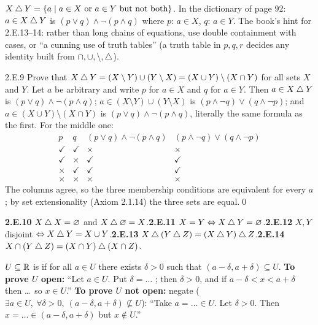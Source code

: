 \begin{key}
$X\mathbin{\triangle} Y=\{a\mid a\in X\text{ or }a\in Y\text{ but not both}\}$. In the dictionary of page 92: $a\in X\mathbin{\triangle} Y$ is $(p\vee q)\wedge\neg(p\wedge q)$ where $p$: $a\in X$, $q$: $a\in Y$. The book's hint for 2.E.13--14: rather than long chains of equations, use double containment with cases, or ``a cunning use of truth tables'' (a truth table in $p,q,r$ decides any identity built from $\cap,\cup,\setminus,\mathbin{\triangle}$).
\end{key}

\begin{bookex}{2.E.9}
Prove that $X\mathbin{\triangle} Y=(X\setminus Y)\cup(Y\setminus X)=(X\cup Y)\setminus(X\cap Y)$ for all sets $X$ and $Y$.
\solution
Let $a$ be arbitrary and write $p$ for $a\in X$ and $q$ for $a\in Y$. Then $a\in X\mathbin{\triangle} Y$ is $(p\vee q)\wedge\neg(p\wedge q)$; $a\in(X\setminus Y)\cup(Y\setminus X)$ is $(p\wedge\neg q)\vee(q\wedge\neg p)$; and $a\in(X\cup Y)\setminus(X\cap Y)$ is $(p\vee q)\wedge\neg(p\wedge q)$, literally the same formula as the first. For the middle one:
\[
\begin{array}{cc|c|c}
p&q&(p\vee q)\wedge\neg(p\wedge q)&(p\wedge\neg q)\vee(q\wedge\neg p)\\\hline
\checkmark&\checkmark&\times&\times\\
\checkmark&\times&\checkmark&\checkmark\\
\times&\checkmark&\checkmark&\checkmark\\
\times&\times&\times&\times
\end{array}
\]
The columns agree, so the three membership conditions are equivalent for every $a$; by set extensionality (Axiom 2.1.14) the three sets are equal.\qed
\end{bookex}

\begin{trybox}[{2.E.10--2.E.14 \fO}]
\textbf{2.E.10} $X\mathbin{\triangle} X=\varnothing$ and $X\mathbin{\triangle}\varnothing=X$.\quad \textbf{2.E.11} $X=Y\Leftrightarrow X\mathbin{\triangle} Y=\varnothing$.\quad \textbf{2.E.12} $X,Y$ disjoint $\Leftrightarrow X\mathbin{\triangle} Y=X\cup Y$.\quad \textbf{2.E.13} $X\mathbin{\triangle}(Y\mathbin{\triangle} Z)=(X\mathbin{\triangle} Y)\mathbin{\triangle} Z$.\quad \textbf{2.E.14} $X\cap(Y\mathbin{\triangle} Z)=(X\cap Y)\mathbin{\triangle}(X\cap Z)$.
\end{trybox}

\begin{key}
$U\subseteq\mathbb{R}$ is  if for all $a\in U$ there exists $\delta>0$ such that $(a-\delta,a+\delta)\subseteq U$. \textbf{To prove $U$ open:} ``Let $a\in U$. Put $\delta=\dots$ ; then $\delta>0$, and if $a-\delta<x<a+\delta$ then \dots\ so $x\in U$.'' \textbf{To prove $U$ not open:} negate ($\exists a\in U,\ \forall\delta>0,\ (a-\delta,a+\delta)\nsubseteq U$): ``Take $a=\dots\in U$. Let $\delta>0$. Then $x=\dots\in(a-\delta,a+\delta)$ but $x\notin U$.''
\end{key}

